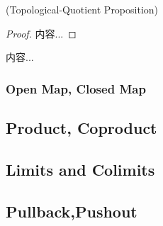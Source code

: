 \documentclass[Total.tex]{subfiles}
\begin{document}
				\begin{proposition}
					(Topological-Quotient Proposition)
				\end{proposition}
				\begin{proof}
					内容...
				\end{proof}
				\begin{Def}
					内容...
				\end{Def}
				\subsubsection{Open Map, Closed Map}
			\subsection{Product, Coproduct}
			\subsection{Limits and Colimits}
			\subsection{Pullback,Pushout}
				
\end{document}
